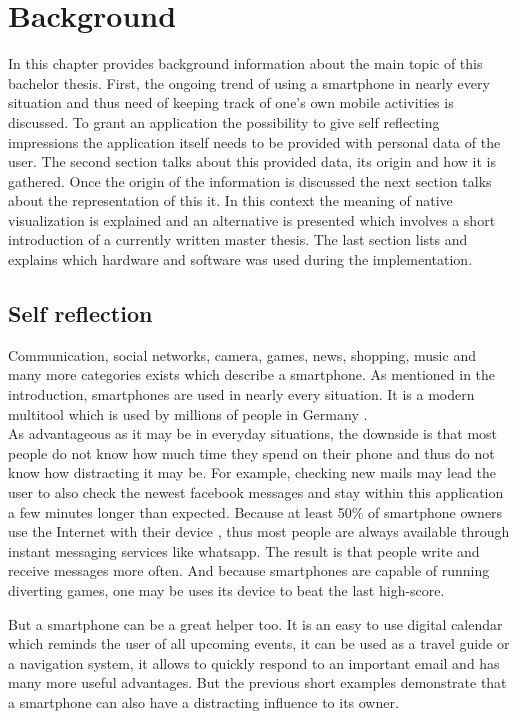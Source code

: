 \chapter{Background}
\label{cha:background}
In this chapter provides background information about the main topic of this bachelor thesis. First, the ongoing trend of using a smartphone in nearly every situation and thus need of keeping track of one's own mobile activities is discussed. To grant an application the possibility to give self reflecting impressions the application itself needs to be provided with personal data of the user. The second section talks about this provided data, its origin and how it is gathered. Once the origin of the information is discussed the next section talks about the representation of this it. In this context the meaning of native visualization is explained and an alternative is presented which involves a short introduction of a currently written master thesis. The last section lists and explains which hardware and software was used during the implementation.

\section{Self reflection}
Communication, social networks, camera, games, news, shopping, music and many more categories exists which describe a smartphone. As mentioned in the introduction, smartphones are used in nearly every situation. It is a modern multitool which is used by millions of people in Germany \cite{gstatistic}.\\
As  advantageous as it may be in everyday situations, the downside is that most people do not know how much time they spend on their phone and thus do not know how distracting it may be.
For example, checking new mails may lead the user to also check the newest facebook messages and stay within this application a few minutes longer than expected. Because at least 50\% of smartphone owners use the Internet with their device \cite{gstatistic}, thus most people are always available through instant messaging services like whatsapp. The result is that people write and receive messages more often. And because smartphones are capable of running diverting games, one may be uses its device to beat the last high-score.

But a smartphone  can be a great helper too. It is an easy to use digital calendar which reminds the user of all upcoming events, it can be used as a travel guide or a navigation system, it allows to quickly respond to an important email and has many more useful advantages. But the previous short examples demonstrate that a smartphone can also have a distracting influence to its owner.

